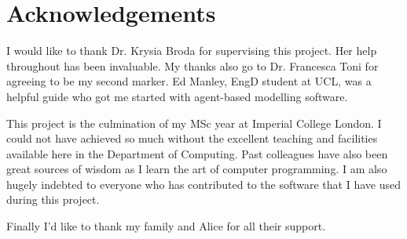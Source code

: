\section*{Acknowledgements}

I would like to thank Dr. Krysia Broda for supervising this project. Her help throughout has been invaluable. My thanks also go to Dr. Francesca Toni for agreeing to be my second marker. Ed Manley, EngD student at UCL, was a helpful guide who got me started with agent-based modelling software.

This project is the culmination of my MSc year at Imperial College London. I could not have achieved so much without the excellent teaching and facilities available here in the Department of Computing. Past colleagues have also been great sources of wisdom as I learn the art of computer programming. I am also hugely indebted to everyone who has contributed to the software that I have used during this project.

Finally I'd like to thank my family and Alice for all their support.